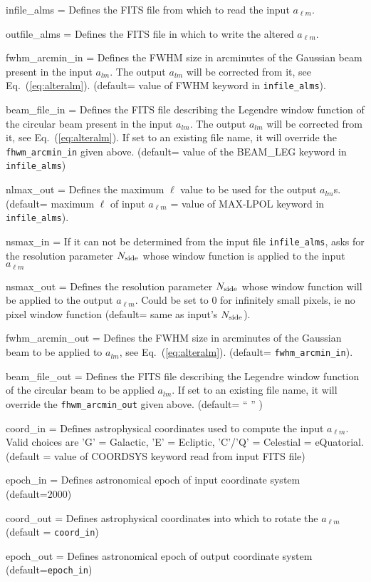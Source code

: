 \begin{qualifiers}
  \begin{qulist}{} %
    \item[{infile\_alms = }] Defines the FITS file from which to read the input
	$a_{\ell m}$.
    \item[{outfile\_alms = }] Defines the FITS file in which to write the altered
	$a_{\ell m}$.
    \item[{fwhm\_arcmin\_in = }] Defines the FWHM size in arcminutes 
      of the Gaussian beam present in the input $a_{lm}$. The output $a_{lm}$ will be
      corrected from it, see Eq.~(\ref{eq:alteralm}). (default= value of FWHM keyword in {\tt infile\_alms}).
    \item[{beam\_file\_in = }] Defines the FITS file describing the
      Legendre window function of the circular beam present in the input $a_{lm}$. The output $a_{lm}$ will be
      corrected from it, see Eq.~(\ref{eq:alteralm}). If set to an existing file name, it will override the
    {\tt fhwm\_arcmin\_in} given above. (default= value of the BEAM\_LEG keyword in {\tt infile\_alms})
     \item[{nlmax\_out = }] Defines the maximum $\ell$ value 
       to be used for the output $a_{lm}$s. (default= maximum $\ell$ of input
       $a_{\ell m}$ = value of MAX-LPOL keyword in {\tt infile\_alms}).
     \item[{nsmax\_in = }] If it can not be determined from the input file {\tt infile\_alms}, asks
       for the \healpix resolution parameter ${N_{\rm side}}$ whose
       window function is applied to the input $a_{\ell m}$
     \item[{nsmax\_out = }] Defines the \healpix resolution parameter ${N_{\rm side}}$ whose
       window function will be applied to the output $a_{\ell m}$. Could be set
       to 0 for infinitely small pixels, ie no pixel window function (default= same as input's ${N_{\rm side}}$).
    \item[{fwhm\_arcmin\_out = }] Defines the FWHM size in arcminutes 
      of the Gaussian beam to be applied to $a_{lm}$, see
      Eq.~(\ref{eq:alteralm}). (default= {\tt fwhm\_arcmin\_in}).
    \item[{beam\_file\_out = }] Defines the FITS file describing the
      Legendre window function of the circular beam to be applied $a_{lm}$. If
      set to an existing file name, it will override the 
    {\tt fhwm\_arcmin\_out} given above. (default= `` '' )
    \item[{coord\_in = }] Defines astrophysical coordinates used to compute the
    input $a_{\ell m}$. Valid choices are 'G' = Galactic, 'E' = Ecliptic, 
    'C'/'Q' = Celestial = eQuatorial. (default = value of COORDSYS keyword read
    from input FITS file)
    \item[{epoch\_in = }] Defines astronomical epoch of input coordinate system (default=2000)
    \item[{coord\_out = }] Defines astrophysical coordinates into which to rotate
    the $a_{\ell m}$ (default = {\tt coord\_in})
    \item[{epoch\_out = }] Defines astronomical epoch of output coordinate system
    (default={\tt epoch\_in})


\end{qulist}
\end{qualifiers}
